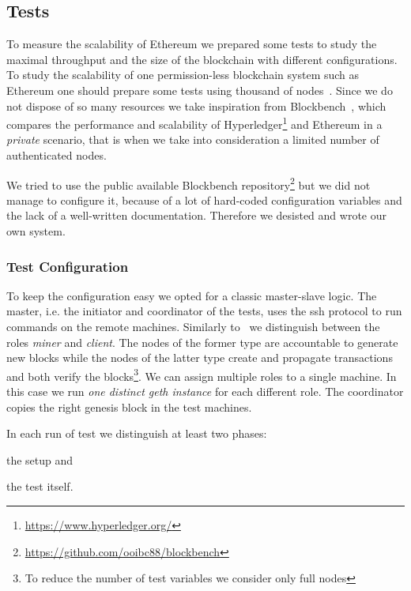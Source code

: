\subsection{Tests}
\label{sec:tests}

To measure the scalability of Ethereum we prepared some tests to study the
maximal throughput and the size of the blockchain with different configurations.
To study the scalability of one permission-less blockchain system such as
Ethereum one should prepare some tests using thousand of
nodes~\cite{bib:securityAndScalabilityPoW, bib:algorand}. Since we do not
dispose of so many resources we take inspiration from
Blockbench~\cite{blockbench}, which compares the performance and scalability of
Hyperledger\footnote{\url{https://www.hyperledger.org/}} and Ethereum in a
\emph{private} scenario, that is when we take into consideration a limited
number of authenticated nodes.

We tried to use the public available Blockbench
repository\footnote{\url{https://github.com/ooibc88/blockbench}} but we did not
manage to configure it, because of a lot of hard-coded configuration variables
and the lack of a well-written documentation. Therefore we desisted and wrote
our own system.


\subsubsection{Test Configuration}

To keep the configuration easy we opted for a classic master-slave logic. The
master, i.e. the initiator and coordinator of the tests, uses the ssh protocol
to run commands on the remote machines. Similarly to~\cite{blockbench} we
distinguish between the roles \emph{miner} and \emph{client}. The nodes of the
former type are accountable to generate new blocks while the nodes of the latter
type create and propagate transactions and both verify the blocks\footnote{To
reduce the number of test variables we consider only full nodes}. We can assign
multiple roles to a single machine. In this case we run \emph{one distinct geth
instance} for each different role. The coordinator copies the right genesis
block in the test machines.

In each run of test we distinguish at least two phases:
\begin{enumerate*}
  \item the setup and
  \item the test itself.
\end{enumerate*}

